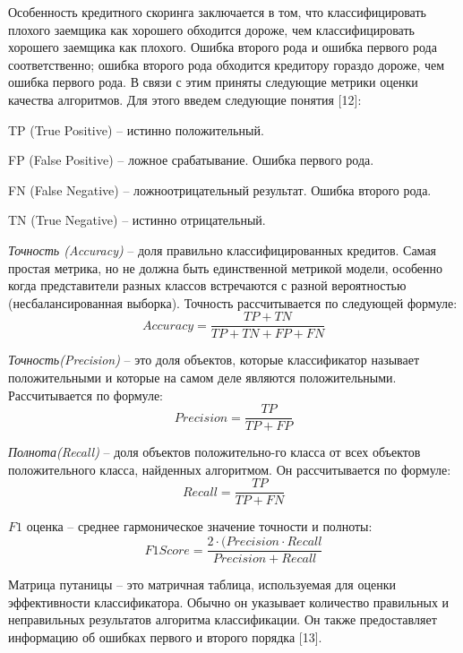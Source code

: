 \begin{multicols}{2}
Особенность кредитного скоринга заключается в том, что классифицировать
плохого заемщика как хорошего обходится дороже, чем классифицировать
хорошего заемщика как плохого. Ошибка второго рода и ошибка первого рода
соответственно; ошибка второго рода обходится кредитору гораздо дороже,
чем ошибка первого рода. В связи с этим приняты следующие метрики оценки
качества алгоритмов. Для этого введем следующие понятия {[}12{]}:

TP (True Positive) -- истинно положительный.

FP (False Positive) -- ложное срабатывание. Ошибка первого рода.

FN (False Negative) -- ложноотрицательный результат. Ошибка второго
рода.

TN (True Negative) -- истинно отрицательный.

\emph{Точность (Accuracy)} -- доля правильно классифицированных
кредитов. Самая простая метрика, но не должна быть единственной метрикой
модели, особенно когда представители разных классов встречаются с разной
вероятностью (несбалансированная выборка). Точность рассчитывается по
следующей формуле:
\begin{equation}
	Accuracy = \frac{TP + TN}{TP + TN + FP + FN}
\end{equation}

\emph{Точность(Precision)} -- это доля объектов, которые классификатор
называет положительными и которые на самом деле являются положительными.
Рассчитывается по формуле:
\begin{equation}
	Precision = \frac{TP}{TP + FP }
\end{equation}

\emph{Полнота(Recall)} -- доля объектов положительно-го класса от всех
объектов положительного класса, найденных алгоритмом. Он рассчитывается
по формуле:
\begin{equation}
	Recall = \frac{TP}{TP + FN }
\end{equation}

$F1$ оценка -- среднее гармоническое
значение точности и полноты:
\begin{equation}
	F1Score = \frac{2\cdot(Precision \cdot Recall}{Precision + Recall }
\end{equation}

Матрица путаницы -- это матричная таблица, используемая для оценки
эффективности классификатора. Обычно он указывает количество правильных
и неправильных результатов алгоритма классификации. Он также
предоставляет информацию об ошибках первого и второго порядка {[}13{]}.

\end{multicols}

